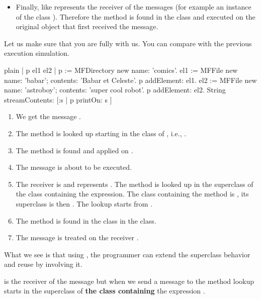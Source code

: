 \documentclass[10pt,twoside,english]{_support/latex/sbabook/sbabook}
\begin{document}
\begin{itemize}
\item Finally,  like  represents the receiver of the messages (for example an instance of the class ). Therefore the method is found in the class  and executed on the original object that first received the message.
\end{itemize}

Let us make sure that you are fully with us. You can compare with the previous execution simulation.

\begin{displaycode}{plain}
| p el1 el2 |
p := MFDirectory new name: 'comics'.
el1 := MFFile new name: 'babar'; contents: 'Babar et Celeste'.
p addElement: el1.
el2 := MFFile new name: 'astroboy'; contents: 'super cool robot'.
p addElement: el2.
String streamContents: [:s | p printOn: s ]
\end{displaycode}

\begin{enumerate}
\item We get the message .
\item The method  is looked up starting in the class of , i.e., .
\item The method is found and applied on .
\item The message   is about to be executed.
\item The receiver is  and represents . The method  is looked up in the superclass of the class containing the expression. The class containing the method is , its superclass is then . The lookup starts from .
\item The method is found in the class  in the class.
\item The message  is treated on the receiver .
\end{enumerate}

What we see is that using , the programmer can extend the superclass behavior and reuse by involving it.

\begin{important}
 is the receiver of the message but when we send a message to  the method lookup starts in the superclass of \textbf{the class containing} the expression .
\end{important}
\end{document}
